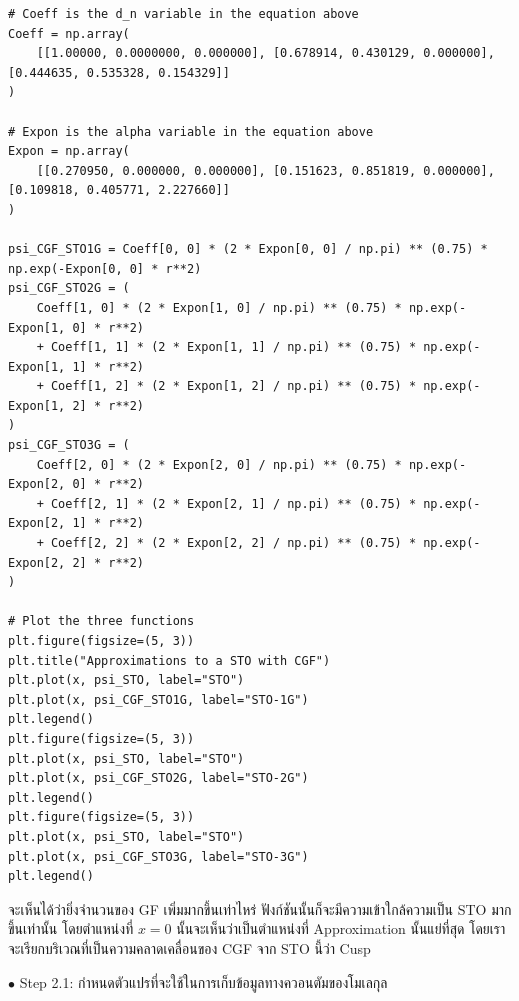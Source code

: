 \vspace{5pt}

\begin{lstlisting}[style=MyPython]
# Coeff is the d_n variable in the equation above
Coeff = np.array(
    [[1.00000, 0.0000000, 0.000000], [0.678914, 0.430129, 0.000000], [0.444635, 0.535328, 0.154329]]
)

# Expon is the alpha variable in the equation above
Expon = np.array(
    [[0.270950, 0.000000, 0.000000], [0.151623, 0.851819, 0.000000], [0.109818, 0.405771, 2.227660]]
)

psi_CGF_STO1G = Coeff[0, 0] * (2 * Expon[0, 0] / np.pi) ** (0.75) * np.exp(-Expon[0, 0] * r**2)
psi_CGF_STO2G = (
    Coeff[1, 0] * (2 * Expon[1, 0] / np.pi) ** (0.75) * np.exp(-Expon[1, 0] * r**2)
    + Coeff[1, 1] * (2 * Expon[1, 1] / np.pi) ** (0.75) * np.exp(-Expon[1, 1] * r**2)
    + Coeff[1, 2] * (2 * Expon[1, 2] / np.pi) ** (0.75) * np.exp(-Expon[1, 2] * r**2)
)
psi_CGF_STO3G = (
    Coeff[2, 0] * (2 * Expon[2, 0] / np.pi) ** (0.75) * np.exp(-Expon[2, 0] * r**2)
    + Coeff[2, 1] * (2 * Expon[2, 1] / np.pi) ** (0.75) * np.exp(-Expon[2, 1] * r**2)
    + Coeff[2, 2] * (2 * Expon[2, 2] / np.pi) ** (0.75) * np.exp(-Expon[2, 2] * r**2)
)

# Plot the three functions
plt.figure(figsize=(5, 3))
plt.title("Approximations to a STO with CGF")
plt.plot(x, psi_STO, label="STO")
plt.plot(x, psi_CGF_STO1G, label="STO-1G")
plt.legend()
plt.figure(figsize=(5, 3))
plt.plot(x, psi_STO, label="STO")
plt.plot(x, psi_CGF_STO2G, label="STO-2G")
plt.legend()
plt.figure(figsize=(5, 3))
plt.plot(x, psi_STO, label="STO")
plt.plot(x, psi_CGF_STO3G, label="STO-3G")
plt.legend()
\end{lstlisting}

\vspace{5pt}

จะเห็นได้ว่ายิ่งจำนวนของ GF เพิ่มมากขึ้นเท่าไหร่ ฟังก์ชันนั้นก็จะมีความเข้าใกล้ความเป็น STO มากขึ้นเท่านั้น โดยตำแหน่งที่ $x = 0$ นั้นจะเห็นว่าเป็นตำแหน่งที่ Approximation นั้นแย่ที่สุด โดยเราจะเรียกบริเวณที่เป็นความคลาดเคลื่อนของ CGF จาก STO นี้ว่า Cusp

\noindent {}

\noindent $\bullet$ Step 2.1: กำหนดตัวแปรที่จะใช้ในการเก็บข้อมูลทางควอนตัมของโมเลกุล

\vspace{5pt}

